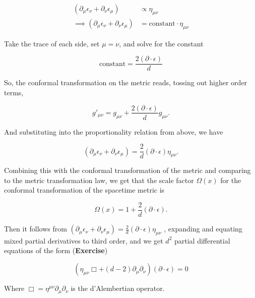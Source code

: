 \begin{align}
(\partial_\mu \epsilon_\nu + \partial_\nu \epsilon_\mu) &\propto \eta_{\mu\nu} \\
\implies (\partial_\mu \epsilon_\nu + \partial_\nu \epsilon_\mu) &= \text{constant} \cdot \eta_{\mu\nu}
\end{align}

\noindent Take the trace of each side, set $\mu=\nu$, and solve for the constant

\begin{equation}
\text{constant} = \frac{2 (\partial \cdot \epsilon)}{d}
\end{equation}

\noindent So, the conformal transformation on the metric reads, tossing out higher order terms,

\begin{equation}
g'_{\mu\nu} = g_{\mu\nu} + \frac{2 (\partial \cdot \epsilon)}{d} g_{\mu\nu}.
\end{equation}

\noindent And substituting into the proportionality relation from above, we have

\begin{equation}
(\partial_\mu \epsilon_\nu + \partial_\nu \epsilon_\mu) = \frac{2}{d} (\partial \cdot \epsilon) \eta_{\mu\nu}.
\end{equation}

\noindent Combining this with the conformal transformation of the metric and comparing to the metric transformation law, we get that the scale factor $\Omega(x)$ for the conformal transformation of the spacetime metric is 

\begin{equation}
\Omega(x) = 1+\frac{2}{d} (\partial \cdot \epsilon).
\end{equation}

\noindent Then it follows from $(\partial_\mu \epsilon_\nu + \partial_\nu \epsilon_\mu) = \frac{2}{d} (\partial \cdot \epsilon) \eta_{\mu\nu}$ , expanding and equating mixed partial derivatives to third order, and we get $d^2$ partial differential equations of the form (\textbf{Exercise})

\begin{equation}
(\eta_{\mu\nu} \Box + (d-2) \partial_\mu \partial_\nu) (\partial \cdot \epsilon) = 0
\end{equation}

\noindent Where $\Box = \eta^{\mu\nu} \partial_\mu \partial_\nu$ is the d'Alembertian operator.

